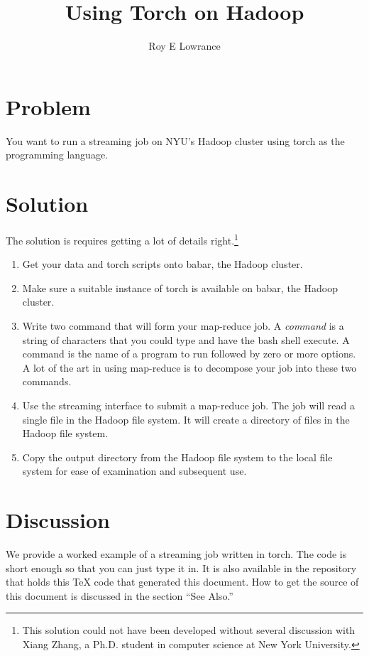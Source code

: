 \documentclass{article}
\begin{document}
\title{Using Torch on Hadoop}
\author{Roy E Lowrance}
\maketitle


\section{Problem}

You want to run a streaming job on NYU's Hadoop cluster using torch as
the programming language.

\section{Solution}

The solution is requires getting a lot of details right.\footnote{This
  solution could not have been developed without several discussion with
  Xiang Zhang, a Ph.D. student in computer science at New York
University.}

\begin{enumerate}
  \item Get your data and torch scripts onto babar, the Hadoop cluster.
  \item Make sure a suitable instance of torch is available on babar,
    the Hadoop cluster.
  \item Write two command that will form your map-reduce job. A
      \emph{command} is a string of characters that you could type and
      have the bash shell execute. A command is the name of a program to
      run followed by zero or more options. A lot of the art in using
      map-reduce is to decompose your job into these two commands.
  \item Use the streaming interface to submit a map-reduce job. The job
    will read a single file in the Hadoop file system. It will create a
    directory of files in the Hadoop file system.
  \item Copy the output directory from the Hadoop file system to the
    local file system for ease of examination and subsequent use.
\end{enumerate}

\section{Discussion}

We provide a worked example of a streaming job written in torch. The
code is short enough so that you can just type it in. It is also
available in the repository that holds this TeX code that generated this
document. How to get the source of this document is discussed in the
section ``See Also.''
\end{document}
